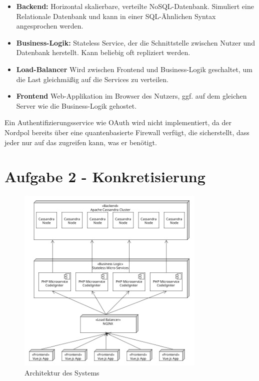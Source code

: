 \documentclass[12pt]{article}
\begin{document}
\begin{itemize}
	\item \textbf{Backend:} Horizontal skalierbare, verteilte NoSQL-Datenbank. Simuliert eine Relationale Datenbank und kann in einer SQL-Ähnlichen Syntax angesprochen werden.
	\item \textbf{Business-Logik:} Stateless Service, der die Schnittstelle zwischen Nutzer und Datenbank herstellt. Kann beliebig oft repliziert werden.
	\item \textbf{Load-Balancer} Wird zwischen Frontend und Business-Logik geschaltet, um die Last gleichmäßig auf die Services zu verteilen.
	\item \textbf{Frontend} Web-Applikation im Browser des Nutzers, ggf. auf dem gleichen Server wie die Business-Logik gehostet.
\end{itemize}

Ein Authentifizierungsservice wie OAuth wird nicht implementiert, da der Nordpol bereits über eine quantenbasierte Firewall verfügt, die sicherstellt, dass jeder nur auf das zugreifen kann, was er benötigt.

\section*{Aufgabe 2 - Konkretisierung}

\begin{figure}[H]
	\centering
	\includegraphics[width=0.8\textwidth]{./img/architecture}
	\caption{Architektur des Systems}
\end{figure}



	
\end{document}

